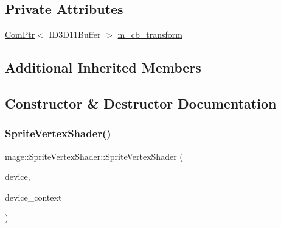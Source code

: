 \subsection*{Private Attributes}
\begin{DoxyCompactItemize}
\item 
\hyperlink{namespacemage_ae74f374780900893caa5555d1031fd79}{Com\+Ptr}$<$ I\+D3\+D11\+Buffer $>$ \hyperlink{classmage_1_1_sprite_vertex_shader_a8d8f7c137da98c64d79d277400750637}{m\+\_\+cb\+\_\+transform}
\end{DoxyCompactItemize}
\subsection*{Additional Inherited Members}


\subsection{Constructor \& Destructor Documentation}
\hypertarget{classmage_1_1_sprite_vertex_shader_a57f08ac16ace6190281fb4fa413c1b9e}{}\label{classmage_1_1_sprite_vertex_shader_a57f08ac16ace6190281fb4fa413c1b9e} 
\subsubsection{\texorpdfstring{Sprite\+Vertex\+Shader()}{SpriteVertexShader()}\hspace{0.1cm}{\footnotesize\ttfamily [1/3]}}
{\footnotesize\ttfamily mage\+::\+Sprite\+Vertex\+Shader\+::\+Sprite\+Vertex\+Shader (\begin{DoxyParamCaption}\item[{I\+D3\+D11\+Device2 $\ast$}]{device,  }\item[{I\+D3\+D11\+Device\+Context2 $\ast$}]{device\+\_\+context }\end{DoxyParamCaption})\hspace{0.3cm}{\ttfamily [explicit]}}

\hypertarget{classmage_1_1_sprite_vertex_shader_a00f902a89cc3f9c9ce3d5b526eece29c}{}\label{classmage_1_1_sprite_vertex_shader_a00f902a89cc3f9c9ce3d5b526eece29c} 
